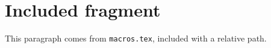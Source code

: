 \section{Included fragment}
This paragraph comes from \texttt{macros.tex}, included with a relative path.
